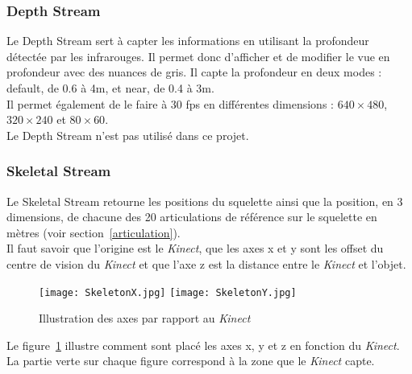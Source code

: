 \subsubsection{Depth Stream}
Le \textsf{Depth Stream} sert à capter les informations en utilisant la profondeur détectée par les infrarouges. Il permet donc d'afficher et de modifier le vue en profondeur avec des nuances de gris.
Il capte la profondeur en deux modes : \textsf{default}, de 0.6 à 4m, et \textsf{near}, de 0.4 à 3m. \\
Il permet également de le faire à 30 fps en différentes dimensions : $640\times 480$, $320\times 240$ et $80\times 60$.\\ 
Le \textsf{Depth Stream} n'est pas utilisé dans ce projet.

\pagebreak
\subsubsection{Skeletal Stream}
Le \textsf{Skeletal Stream} retourne les positions du squelette ainsi que la position, en 3 dimensions, de chacune des 20 articulations de référence sur le squelette en mètres (voir section~\ref{articulation}). \\
Il faut savoir que l'origine est le \textit{Kinect}, que les axes x et y sont les offset du centre de vision du \textit{Kinect} et que l'axe z est la distance entre le \textit{Kinect} et l'objet.\\

\begin{figure}[H]
\texttt{[image: SkeletonX.jpg]}
\texttt{[image: SkeletonY.jpg]}
\caption{\label{positions} Illustration des axes par rapport au \textit{Kinect}}
\end{figure}
Le figure~\ref{positions} illustre comment sont placé les axes x, y et z en fonction du \textit{Kinect}. La partie verte sur chaque figure correspond à la zone que le \textit{Kinect} capte.


